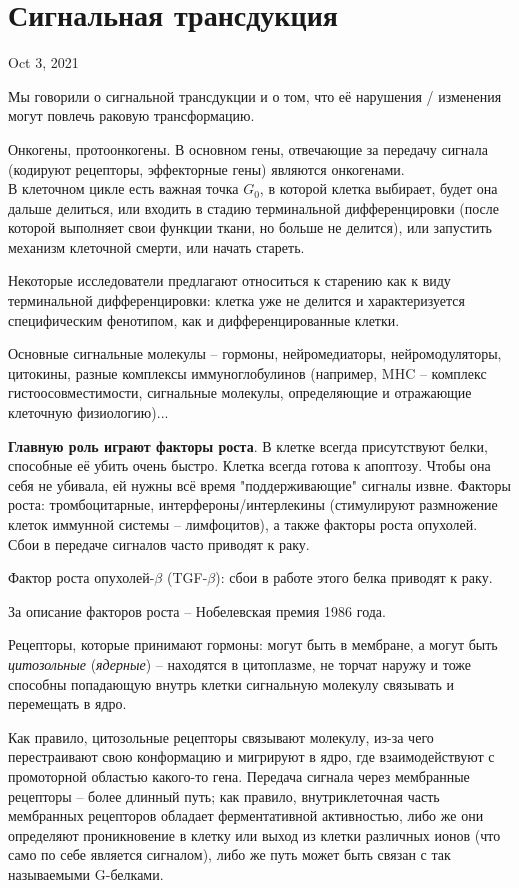 \documentclass[main.tex]{subfiles}
\begin{document}
\section{Сигнальная трансдукция}
Oct 3, 2021 %

Мы говорили о сигнальной трансдукции и о том, что её нарушения / изменения могут повлечь раковую трансформацию.

Онкогены, протоонкогены.
В основном гены, отвечающие за передачу сигнала (кодируют рецепторы, эффекторные гены) являются онкогенами. \\

В клеточном цикле есть важная точка $ G_0 $, в которой клетка выбирает, будет она дальше делиться, или входить в стадию терминальной дифференцировки (после которой выполняет свои функции ткани, но больше не делится), или запустить механизм клеточной смерти, или начать стареть.

Некоторые исследователи предлагают относиться к старению как к виду терминальной дифференцировки: клетка уже не делится и характеризуется специфическим фенотипом, как и дифференцированные клетки.

Основные сигнальные молекулы -- гормоны, нейромедиаторы, нейромодуляторы, цитокины, разные комплексы иммуноглобулинов (например, MHC -- комплекс гистоосовместимости, сигнальные молекулы, определяющие и отражающие клеточную физиологию)...

\textbf{Главную роль играют факторы роста}.
В клетке всегда присутствуют белки, способные её убить очень быстро.
Клетка всегда готова к апоптозу.
Чтобы она себя не убивала, ей нужны всё время "поддерживающие" сигналы извне.
Факторы роста: тромбоцитарные, интерфероны/интерлекины (стимулируют размножение клеток иммунной системы -- лимфоцитов), а также факторы роста опухолей.
Сбои в передаче сигналов часто приводят к раку.

Фактор роста опухолей-$\beta$ (TGF-$\beta$): сбои в работе этого белка приводят к раку.

За описание факторов роста -- Нобелевская премия 1986 года.


Рецепторы, которые принимают гормоны: могут быть в мембране, а могут быть \emph{цитозольные} (\emph{ядерные}) -- находятся в цитоплазме, не торчат наружу и тоже способны попадающую внутрь клетки сигнальную молекулу связывать и перемещать в ядро.

Как правило, цитозольные рецепторы связывают молекулу, из-за чего перестраивают свою конформацию и мигрируют в ядро, где взаимодействуют с промоторной областью какого-то гена.
Передача сигнала через мембранные рецепторы -- более длинный путь; как правило,  внутриклеточная часть мембранных рецепторов обладает ферментативной активностью, либо же они определяют проникновение в клетку или выход из клетки различных ионов (что само по себе является сигналом), либо же путь может быть связан с так называемыми  G-белками.
\end{document}
